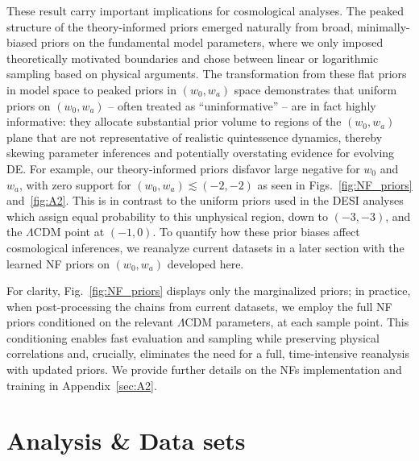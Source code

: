 \documentclass[floats,floatfix,showpacs,amssymb,prd,twocolumn,superscriptaddress,nofootinbib,reprint,preprintnumbers]{revtex4-2}
\begin{document}
These result carry important implications for cosmological analyses. The peaked structure of the theory-informed priors emerged naturally from broad, minimally-biased priors on the fundamental model parameters, where we only imposed theoretically motivated boundaries and chose between linear or logarithmic sampling based on physical arguments. The transformation from these flat priors in model space to peaked priors in $(w_0, w_a)$ space demonstrates that uniform priors on $(w_0, w_a)$ -- often treated as ``uninformative'' -- are in fact highly informative: they allocate substantial prior volume to regions of the $(w_0,w_a)$ plane that are not representative of realistic quintessence dynamics, thereby skewing parameter inferences and potentially overstating evidence for evolving DE. For example, our theory-informed priors disfavor large negative for $w_0$ and $w_a$, with zero support for $(w_0,w_a)\lesssim (-2,-2)$ as seen in Figs.~\ref{fig:NF_priors} and~\ref{fig:A2}. This is in contrast to the uniform priors used in the DESI analyses which assign equal probability to this unphysical region, down to $(-3,-3)$, and the $\Lambda$CDM point at $(-1, 0)$. To quantify how these prior biases affect cosmological inferences, we reanalyze current datasets in a later section with the learned NF priors on $(w_0,w_a)$ developed here.

For clarity, Fig.~\ref{fig:NF_priors} displays only the marginalized 
 priors;  in practice, when post-processing the chains from current datasets, we employ the full NF priors conditioned on the relevant $\Lambda$CDM parameters, 
 at each sample point. This conditioning enables fast evaluation and sampling while preserving physical correlations and, crucially, eliminates the need for a full, time-intensive reanalysis with updated priors.
We provide further details on the NFs implementation and training in Appendix~\ref{sec:A2}.

 
\section{Analysis \& Data sets} \label{AnalysisAndDatasets}
\end{document}
